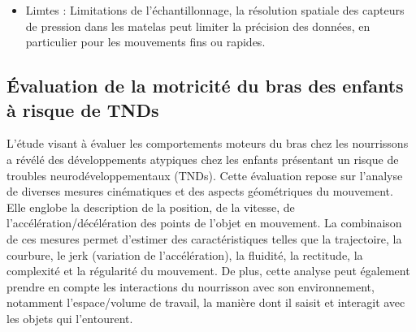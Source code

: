 \documentclass[8pt]{article}
\begin{document}
\begin{itemize}
\begin{itemize}[label={\textbullet}, leftmargin=*]
        \item Limtes : Limitations de l'échantillonnage, la résolution spatiale des capteurs de pression dans les matelas peut limiter la précision des données, en particulier pour les mouvements fins ou rapides.
    \end{itemize}
\end{itemize}

\subsection{Évaluation de la motricité du bras des enfants à risque de TNDs}

\par L'étude visant à évaluer les comportements moteurs du bras chez les nourrissons a révélé des développements atypiques chez les enfants présentant un risque de troubles neurodéveloppementaux (TNDs). Cette évaluation repose sur l'analyse de diverses mesures cinématiques et des aspects géométriques du mouvement. Elle englobe la description de la position, de la vitesse, de l'accélération/décélération des points de l'objet en mouvement. La combinaison de ces mesures permet d'estimer des caractéristiques telles que la trajectoire, la courbure, le jerk (variation de l'accélération), la fluidité, la rectitude, la complexité et la régularité du mouvement. De plus, cette analyse peut également prendre en compte les interactions du nourrisson avec son environnement, notamment l'espace/volume de travail, la manière dont il saisit et interagit avec les objets qui l'entourent. \\  
\end{document}
